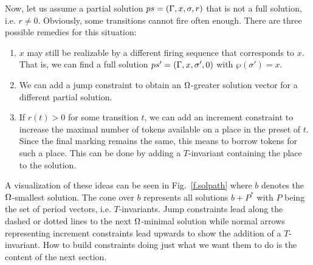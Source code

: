 \documentclass{LMCS}
\newcommand{\parikh}{\wp}
\begin{document}
Now, let us assume a partial solution $ps=({\Gamma},x,\sigma,r)$ that is not a full solution, i.e. $r\neq 0$.
Obviously, some transitions cannot fire often enough. There are three possible remedies for this situation:
\begin{enumerate}[(1)]
\item $x$ may still be realizable by a different firing sequence that corresponds to $x$. That is, we can find a full solution $ps'=({\Gamma},x,\sigma',0)$ with $\parikh(\sigma')=x$.
\item We can add a jump constraint to obtain an $\Omega$-greater solution vector for a different partial solution.
\item If $r(t)>0$ for some transition $t$, we can add an increment constraint to increase the maximal number of tokens available on
	a place in the preset of $t$. Since the final marking remains the same, this means to borrow tokens for such a place. This
	can be done by adding a $T$-invariant containing the place to the solution. 
\end{enumerate}\smallskip

\noindent A visualization of these ideas can be seen in Fig.~\ref{f.solpath} where $b$ denotes the $\Omega$-smallest solution.
The cone over $b$ represents all solutions $b+P^*$ with $P$ being the set of period vectors, i.e. $T$-invariants.
Jump constraints lead along the dashed or dotted lines to the next $\Omega$-minimal solution while normal arrows representing
increment constraints lead upwards to show the addition of a $T$-invariant. How to build constraints doing just
what we want them to do is the content of the next section.
\end{document}
